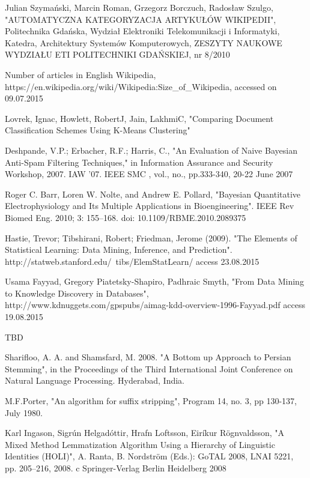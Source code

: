 \cleardoublepage
{}
{}
\begin{thebibliography}{99}

Julian Szymański, Marcin Roman, Grzegorz Borczuch, Radosław Szulgo, "AUTOMATYCZNA KATEGORYZACJA ARTYKUŁÓW WIKIPEDII", Politechnika Gdańska, Wydział Elektroniki Telekomunikacji i Informatyki, Katedra, Architektury Systemów Komputerowych, ZESZYTY NAUKOWE WYDZIAŁU ETI POLITECHNIKI GDAŃSKIEJ, nr 8/2010

Number of articles in English Wikipedia, https://en.wikipedia.org/wiki/Wikipedia:Size\_of\_Wikipedia, accessed on 09.07.2015

Lovrek, Ignac, Howlett, RobertJ, Jain, LakhmiC, "Comparing Document Classification Schemes Using K-Means Clustering"

Deshpande, V.P.; Erbacher, R.F.; Harris, C., "An Evaluation of Naive Bayesian Anti-Spam Filtering Techniques," in Information Assurance and Security Workshop, 2007. IAW '07. IEEE SMC , vol., no., pp.333-340, 20-22 June 2007

Roger C. Barr, Loren W. Nolte, and Andrew E. Pollard, "Bayesian Quantitative Electrophysiology and Its Multiple Applications in Bioengineering". IEEE Rev Biomed Eng. 2010; 3: 155–168.
doi:  10.1109/RBME.2010.2089375


Hastie, Trevor; Tibshirani, Robert; Friedman, Jerome (2009). "The Elements of Statistical Learning: Data Mining, Inference, and Prediction". http://statweb.stanford.edu/~tibs/ElemStatLearn/ access 23.08.2015

Usama Fayyad, Gregory Piatetsky-Shapiro, Padhraic Smyth, "From Data Mining to Knowledge Discovery in Databases", http://www.kdnuggets.com/gpspubs/aimag-kdd-overview-1996-Fayyad.pdf access 19.08.2015

TBD

Sharifloo, A. A. and Shamsfard, M. 2008. "A Bottom up Approach to Persian Stemming", in the Proceedings of the Third International Joint Conference on Natural Language Processing. Hyderabad, India.

M.F.Porter, "An algorithm for suffix stripping", Program 14, no. 3, pp 130-137, July 1980.

Karl Ingason, Sigrún Helgadóttir, Hrafn Loftsson, Eiríkur Rögnvaldsson, "A Mixed Method Lemmatization Algorithm
Using a Hierarchy of Linguistic Identities (HOLI)", A. Ranta, B. Nordström (Eds.): GoTAL 2008, LNAI 5221, pp. 205–216, 2008.
c Springer-Verlag Berlin Heidelberg 2008


\end{thebibliography}
